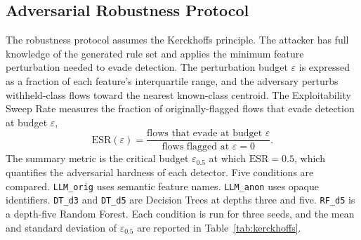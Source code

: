 \subsection{Adversarial Robustness Protocol}
\label{subsec:kerckhoffs}

The robustness protocol assumes the Kerckhoffs principle. The attacker has full knowledge of the generated rule set and applies the minimum feature perturbation needed to evade detection. The perturbation budget $\varepsilon$
is expressed as a fraction of each feature's interquartile range, and the adversary perturbs withheld-class flows toward the nearest known-class centroid. The Exploitability Sweep Rate measures the fraction of originally-flagged flows that evade detection at budget $\varepsilon$,
\[
  \mathrm{ESR}(\varepsilon) = \frac{\text{flows that evade at budget } \varepsilon}
                                   {\text{flows flagged at } \varepsilon = 0} .
\]
The summary metric is the critical budget $\varepsilon_{0.5}$ at which $\mathrm{ESR}=0.5$, which quantifies the adversarial hardness of each detector. Five conditions are compared. \texttt{LLM\_orig} uses semantic feature names. \texttt{LLM\_anon} uses opaque identifiers. \texttt{DT\_d3} and \texttt{DT\_d5} are Decision Trees at depths three and five. \texttt{RF\_d5} is a depth-five Random Forest. Each condition is run for three seeds, and the mean and standard deviation of $\varepsilon_{0.5}$ are reported in Table~\ref{tab:kerckhoffs}.
